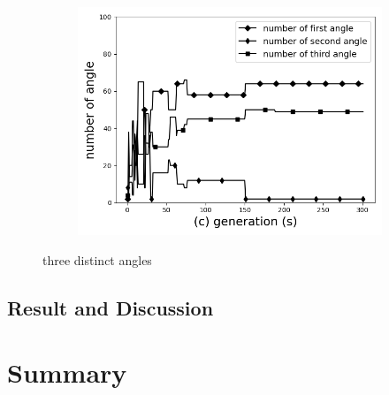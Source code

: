 \begin{figure}[!htb]
		\begin{subfigure}[b]{0.8\linewidth}
			\includegraphics[width=\linewidth]{Figures/chapter4_second_three_distinct_angler_number_of_angle.png}
		\end{subfigure}
	\caption{three distinct angles}
	\label{fig:three_angles}
\end{figure}



\subsection{Result and Discussion}

\section{Summary}

